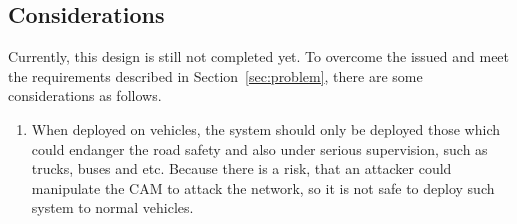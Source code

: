 \subsection{Considerations}

Currently, this design is still not completed yet.
To overcome the issued and meet the requirements described in Section~\ref{sec:problem},
there are some considerations as follows.
\begin{enumerate}
\item When deployed on vehicles,
    the system should only be deployed those which could endanger the road safety and also under serious supervision,
    such as trucks, buses and etc.
    Because there is a risk, that an attacker could manipulate the CAM to attack the network,
    so it is not safe to deploy such system to normal vehicles.
\end{enumerate}
